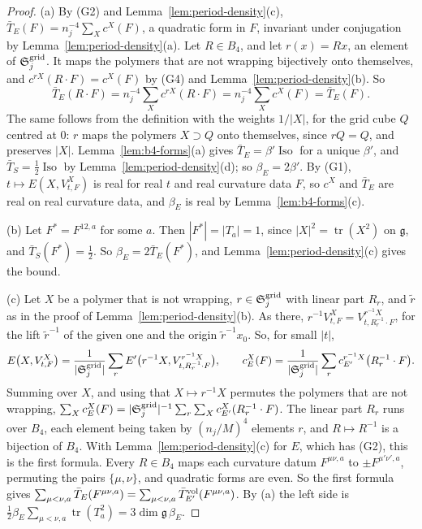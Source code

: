 \begin{proof}
(a) By (G2) and Lemma~\ref{lem:period-density}(c), $\bar T_E(F)=n_j^{-4}\sum_Xc^X(F)$, a quadratic form in $F$, invariant under conjugation by Lemma~\ref{lem:period-density}(a). Let $R\in B_4$, and let $r(x)=Rx$, an element of $\mathfrak S^{\rm grid}_j$. It maps the polymers that are not wrapping bijectively onto themselves, and $c^{rX}(R\cdot F)=c^X(F)$ by (G4) and Lemma~\ref{lem:period-density}(b). So
\[
\bar T_E(R\cdot F)=n_j^{-4}\sum_Xc^{rX}(R\cdot F)=n_j^{-4}\sum_Xc^X(F)=\bar T_E(F).
\]
The same follows from the definition with the weights $1/|X|$, for the grid cube $Q$ centred at $0$: $r$ maps the polymers $X\supset Q$ onto themselves, since $rQ=Q$, and preserves $|X|$. Lemma~\ref{lem:b4-forms}(a) gives $\bar T_E=\beta'\operatorname{Iso}$ for a unique $\beta'$, and $\bar T_S=\frac12\operatorname{Iso}$ by Lemma~\ref{lem:period-density}(d); so $\beta_E=2\beta'$. By (G1), $t\mapsto E(X,V^X_{t,F})$ is real for real $t$ and real curvature data $F$, so $c^X$ and $\bar T_E$ are real on real curvature data, and $\beta_E$ is real by Lemma~\ref{lem:b4-forms}(c).

(b) Let $F^*=F^{12,a}$ for some $a$. Then $|F^*|=|T_a|=1$, since $|X|^2=\operatorname{tr}(X^2)$ on $\mathfrak g$, and $\bar T_S(F^*)=\frac12$. So $\beta_E=2\bar T_E(F^*)$, and Lemma~\ref{lem:period-density}(c) gives the bound.

(c) Let $X$ be a polymer that is not wrapping, $r\in\mathfrak S^{\rm grid}_j$ with linear part $R_r$, and $\tilde r$ as in the proof of Lemma~\ref{lem:period-density}(b). As there, $r^{-1}V^X_{t,F}=V^{r^{-1}X}_{t,R_r^{-1}\cdot F}$, for the lift $\tilde r^{-1}$ of the given one and the origin $\tilde r^{-1}x_0$. So, for small $|t|$,
\[
E\big(X,V^X_{t,F}\big)=\frac1{|\mathfrak S^{\rm grid}_j|}\sum_rE'\big(r^{-1}X,V^{r^{-1}X}_{t,R_r^{-1}\cdot F}\big),\qquad c^X_E(F)=\frac1{|\mathfrak S^{\rm grid}_j|}\sum_rc^{r^{-1}X}_{E'}\big(R_r^{-1}\cdot F\big).
\]
Summing over $X$, and using that $X\mapsto r^{-1}X$ permutes the polymers that are not wrapping, $\sum_Xc^X_E(F)=|\mathfrak S^{\rm grid}_j|^{-1}\sum_r\sum_Xc^X_{E'}(R_r^{-1}\cdot F)$. The linear part $R_r$ runs over $B_4$, each element being taken by $(n_j/M)^4$ elements $r$, and $R\mapsto R^{-1}$ is a bijection of $B_4$. With Lemma~\ref{lem:period-density}(c) for $E$, which has (G2), this is the first formula. Every $R\in B_4$ maps each curvature datum $F^{\mu\nu,a}$ to $\pm F^{\mu'\nu',a}$, permuting the pairs $\{\mu,\nu\}$, and quadratic forms are even. So the first formula gives $\sum_{\mu<\nu,a}\bar T_E(F^{\mu\nu,a})=\sum_{\mu<\nu,a}\bar T^{\rm vol}_{E'}(F^{\mu\nu,a})$. By (a) the left side is $\frac12\beta_E\sum_{\mu<\nu,a}\operatorname{tr}(T_a^2)=3\dim\mathfrak g\,\beta_E$.
\end{proof}

